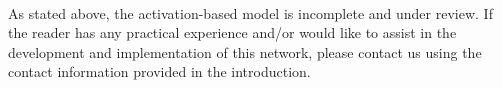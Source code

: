\paragraph{}As stated above, the activation-based model is incomplete and under review. 
If the reader has any practical experience and/or would like to assist in the 
development and implementation of this network, please contact us using the 
contact information provided in the introduction. 
%
%
%
%
%
